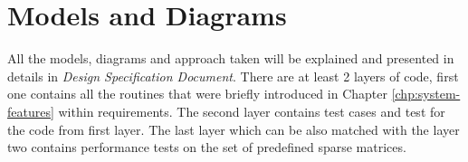 \chapter{Models and Diagrams} \label{chp:models-and-diagrams}
	All the models, diagrams and approach taken will be explained and presented in details in \emph{Design Specification Document}. There are at least 2 layers of code, first one contains all the routines that were briefly introduced in Chapter \ref{chp:system-features} within requirements. The second layer contains test cases and test for the code from first layer. The last layer which can be also matched with the layer two contains performance tests on the set of predefined sparse matrices.